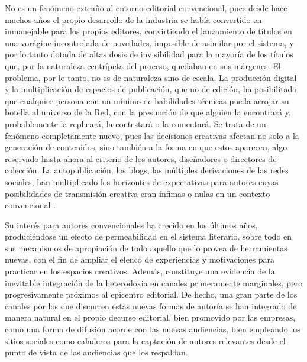 \documentclass[spanish]{textolivre}
\begin{document}
No es un fenómeno extraño al entorno editorial convencional, pues desde hace muchos años el propio desarrollo de la industria se había convertido en inmanejable para los propios editores, convirtiendo el lanzamiento de títulos en una vorágine incontrolada de novedades, imposible de asimilar por el sistema, y por lo tanto dotada de altas dosis de invisibilidad para la mayoría de los títulos que, por la naturaleza centrípeta del proceso, quedaban en sus márgenes. El problema, por lo tanto, no es de naturaleza sino de escala. La producción digital y la multiplicación de espacios de publicación, que no de edición, ha posibilitado que cualquier persona con un mínimo de habilidades técnicas pueda arrojar su botella al universo de la Red, con la presunción de que alguien la encontrará y, probablemente la replicará, la contestará o la comentará. Se trata de un fenómeno completamente nuevo, pues las decisiones creativas afectan no solo a la generación de contenidos, sino también a la forma en que estos aparecen, algo reservado hasta ahora al criterio de los autores, diseñadores o directores de colección. La autopublicación, los blogs, las múltiples derivaciones de las redes sociales, han multiplicado los horizontes de expectativas para autores cuyas posibilidades de transmisión creativa eran ínfimas o nulas en un contexto convencional \cite{cuquerella_cafe_2018}.

Su interés para autores convencionales ha crecido en los últimos años, produciéndose un efecto de permeabilidad en el sistema literario, sobre todo en sus mecanismos de apropiación de todo aquello que lo provea de herramientas nuevas, con el fin de ampliar el elenco de experiencias y motivaciones para practicar en los espacios creativos. Además, constituye una evidencia de la inevitable integración de la heterodoxia en canales primeramente marginales, pero progresivamente próximos al epicentro editorial. De hecho, una gran parte de los canales por los que discurren estas nuevas formas de autoría se han integrado de manera natural en el propio decurso editorial, bien promovido por las empresas, como una forma de difusión acorde con las nuevas audiencias, bien empleando los sitios sociales como caladeros para la captación de autores relevantes desde el punto de vista de las audiencias que los respaldan. 
\end{document}
